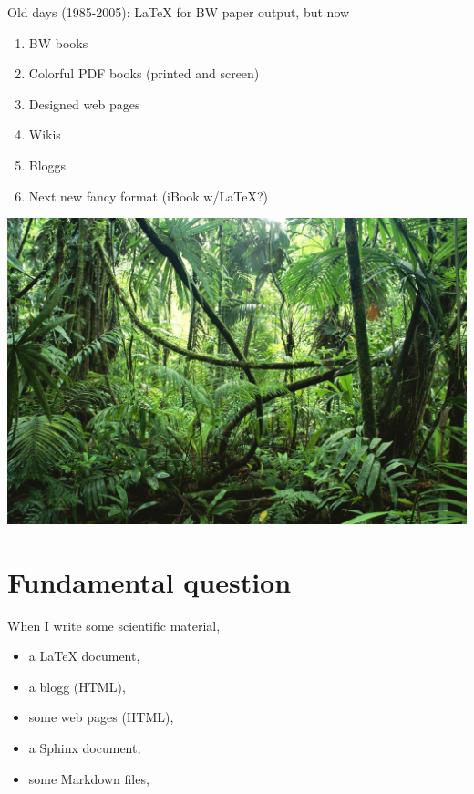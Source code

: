 \documentclass[%
oneside,                 %
final,                   %
chapterprefix=true,      %
open=right               %
10pt]{book}
\begin{document}

Old days (1985-2005): {\LaTeX} for BW paper output, but now

\begin{enumerate}
  \item BW books

  \item Colorful PDF books (printed and screen)

  \item Designed web pages

  \item Wikis

  \item Bloggs

  \item Next new fancy format (iBook w/LaTeX?)
\end{enumerate}

\noindent


\begin{center}  %
  \centerline{\includegraphics[width=0.9\linewidth]{../doc/slides/fig/jungle_with_mess.jpg}}
\end{center}



\section{Fundamental question}

When I write some scientific material,

\begin{itemize}
 \item a {\LaTeX} document,

 \item a blogg (HTML),

 \item some web pages (HTML),

 \item a Sphinx document,

 \item some Markdown files,
\end{itemize}
\end{document}
